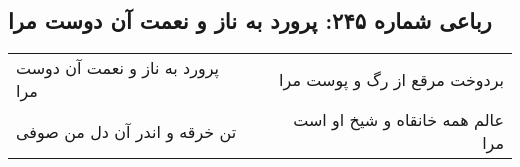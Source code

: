 \begin{center}
\section*{رباعی شماره ۲۴۵: پرورد به ناز و نعمت آن دوست مرا}
\label{sec:0245}
\begin{longtable}{l p{0.5cm} r}
پرورد به ناز و نعمت آن دوست مرا
&&
بردوخت مرقع از رگ و پوست مرا
\\
تن خرقه و اندر آن دل من صوفی
&&
عالم همه خانقاه و شیخ او است مرا
\\
\end{longtable}
\end{center}
